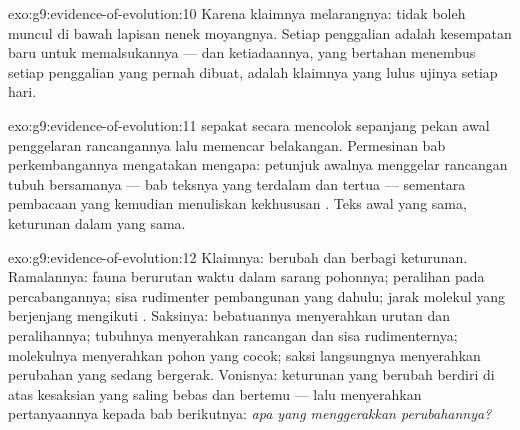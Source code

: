 \begin{solution}{exo:g9:evidence-of-evolution:10}
Karena klaimnya melarangnya:  tidak boleh muncul di
bawah lapisan nenek moyangnya. Setiap penggalian adalah
kesempatan baru untuk memalsukannya --- dan ketiadaannya,
yang bertahan menembus setiap penggalian yang pernah dibuat,
adalah klaimnya yang lulus ujinya setiap hari.
\end{solution}

\begin{solution}{exo:g9:evidence-of-evolution:11}
  sepakat secara mencolok sepanjang pekan
awal penggelaran rancangannya lalu memencar belakangan.
Permesinan bab perkembangannya mengatakan mengapa: petunjuk
awalnya menggelar rancangan tubuh bersamanya --- bab teksnya
yang terdalam dan tertua --- sementara pembacaan yang
kemudian menuliskan kekhususan . Teks awal yang
sama, keturunan dalam yang sama.
\end{solution}

\begin{solution}{exo:g9:evidence-of-evolution:12}
Klaimnya:  berubah dan berbagi keturunan. Ramalannya:
fauna berurutan waktu dalam sarang pohonnya; peralihan pada
percabangannya; sisa rudimenter pembangunan yang dahulu;
jarak molekul yang berjenjang mengikuti .
Saksinya: bebatuannya menyerahkan urutan dan peralihannya;
tubuhnya menyerahkan rancangan dan sisa rudimenternya;
molekulnya menyerahkan pohon yang cocok; saksi langsungnya
menyerahkan perubahan yang sedang bergerak. Vonisnya:
keturunan yang berubah berdiri di atas kesaksian yang saling
bebas dan bertemu --- lalu menyerahkan pertanyaannya kepada
bab berikutnya: \emph{apa yang menggerakkan perubahannya?}
\end{solution}

